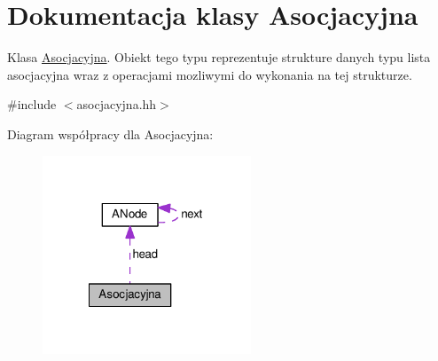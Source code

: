 \hypertarget{class_asocjacyjna}{\section{Dokumentacja klasy Asocjacyjna}
\label{class_asocjacyjna}
}


Klasa \hyperlink{class_asocjacyjna}{Asocjacyjna}. Obiekt tego typu reprezentuje strukture danych typu lista asocjacyjna wraz z operacjami mozliwymi do wykonania na tej strukturze.  




{\ttfamily \#include $<$asocjacyjna.\-hh$>$}



Diagram współpracy dla Asocjacyjna\-:\nopagebreak
\begin{figure}[H]
\begin{center}
\leavevmode
\includegraphics[width=176pt]{class_asocjacyjna__coll__graph}
\end{center}
\end{figure}
